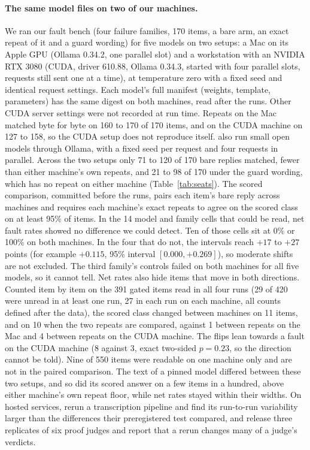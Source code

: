 \documentclass[11pt]{article}
\begin{document}
\paragraph{The same model files on two of our machines.} We ran our fault bench (four failure families, 170 items, a bare arm, an exact
repeat of it and a guard wording) for five models on two setups: a Mac on its Apple GPU (Ollama 0.34.2, one parallel slot) and a workstation with
an NVIDIA RTX 3080 (CUDA, driver 610.88, Ollama 0.34.3, started with four parallel slots, requests still sent one at a time), at temperature zero
with a fixed seed and identical request settings. Each model's full manifest (weights, template, parameters) has the same digest on both
machines, read after the runs. Other CUDA server settings were not recorded at run time. Repeats on the Mac matched byte for byte on 160 to 170 of
170 items, and on the CUDA machine on 127 to 158, so the CUDA setup does not reproduce itself. \citet{r2608_20438} also run small open models through Ollama, with a fixed seed per request
and four requests in parallel. Across the two setups only 71 to 120 of 170 bare
replies matched, fewer than either machine's own repeats, and 21 to 98 of 170 under the guard wording, which has no repeat on either machine
(Table~\ref{tab:seats}). The scored comparison, committed before the runs, pairs each item's bare reply across machines and requires each
machine's exact repeats to agree on the scored class on at least 95\% of items. In the 14 model and family cells that could be read, net fault
rates showed no difference we could detect. Ten of those cells sit at 0\% or 100\% on both machines. In the four that do not, the intervals
reach $+17$ to $+27$ points (for example $+0.115$, 95\% interval $[0.000, +0.269]$), so moderate shifts are not excluded. The third family's
controls failed on both machines for all five models, so it cannot tell. Net rates also hide items that move in both directions. Counted item
by item on the 391 gated items read in all four runs (29 of 420 were unread in at least one run, 27 in each run on each machine, all counts defined after the data), the scored class changed between machines on 11 items, and on
10 when the two repeats are compared, against 1 between repeats on the Mac and 4 between repeats on the CUDA machine. The flips lean towards a
fault on the CUDA machine (8 against 3, exact two-sided $p=0.23$, so the direction cannot be told). Nine of 550 items were readable on one
machine only and are not in the paired comparison. The text of a pinned model differed between these two setups, and so did its scored
answer on a few items in a hundred, above either machine's own repeat floor, while net rates stayed within their widths. On hosted
services, \citet{r2608_28875} rerun a transcription pipeline and find its run-to-run variability larger than the differences their
preregistered test compared, and \citet{r2608_20432} release three replicates of six proof judges and report that a rerun changes many
of a judge's verdicts.
\end{document}
